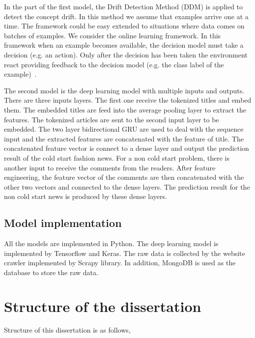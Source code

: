 In the part of the first model, the Drift Detection Method (DDM) is applied to detect the concept drift. In this method we assume that examples arrive one at a time. The framework could be easy extended to situations where data comes on batches of examples. We consider the online learning framework. In this framework when an example becomes available, the decision model must take a decision (e.g. an action). Only after the decision has been taken the environment react providing feedback to the decision model (e.g. the class label of the example)~\cite{gama2004learning}.

The second model is the deep learning model with multiple inputs and outputs. There are three inputs layers. The first one receive the tokenized titles and embed them. The embedded titles are feed into the average pooling layer to extract the features. The tokenized articles are sent to the second input layer to be embedded. The two layer bidirectional GRU are used to deal with the sequence input and the extracted features are concatenated with the feature of title. The concatenated feature vector is connect to a dense layer and output the prediction result of the cold start fashion news. For a non cold start problem, there is another input to receive the comments from the readers. After feature engineering, the feature vector of the comments are then concatenated with the other two vectors and connected to the dense layers. The prediction result for the non cold start news is produced by these dense layers.

\subsection{Model implementation}
All the models are implemented in Python. The deep learning model is implemented by Tensorflow and Keras. The raw data is collected by the website crawler implemented by Scrapy library. In addition, MongoDB is used as the database to store the raw data. 



\section{Structure of the dissertation}
Structure of this dissertation is as follows,

